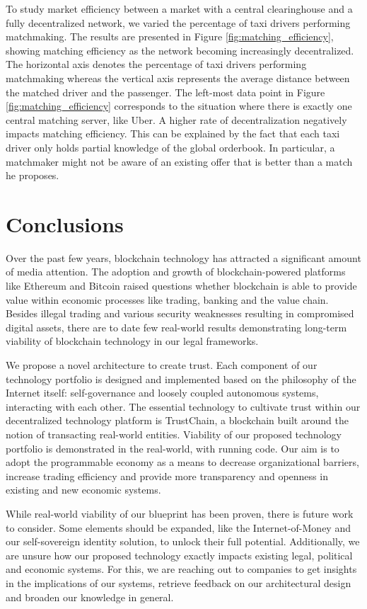 \documentclass[USenglish]{article}
\begin{document}
To study market efficiency between a market with a central clearinghouse and a fully decentralized network, we varied the percentage of taxi drivers performing matchmaking.
The results are presented in Figure \ref{fig:matching_efficiency}, showing matching efficiency as the network becoming increasingly decentralized.
The horizontal axis denotes the percentage of taxi drivers performing matchmaking whereas the vertical axis represents the average distance between the matched driver and the passenger.
The left-most data point in Figure \ref{fig:matching_efficiency} corresponds to the situation where there is exactly one central matching server, like Uber.
A higher rate of decentralization negatively impacts matching efficiency.
This can be explained by the fact that each taxi driver only holds partial knowledge of the global orderbook.
In particular, a matchmaker might not be aware of an existing offer that is better than a match he proposes.

\section{Conclusions}

Over the past few years, blockchain technology has attracted a significant amount of media attention.
The adoption and growth of blockchain-powered platforms like Ethereum and Bitcoin raised questions whether blockchain is able to provide value within economic processes like trading, banking and the value chain.
Besides illegal trading and various security weaknesses resulting in compromised digital assets, there are to date few real-world results demonstrating long-term viability of blockchain technology in our legal frameworks.

We propose a novel architecture to create trust.
Each component of our technology portfolio is designed and implemented based on the philosophy of the Internet itself: self-governance and loosely coupled autonomous systems, interacting with each other.
The essential technology to cultivate trust within our decentralized technology platform is TrustChain, a blockchain built around the notion of transacting real-world entities.
Viability of our proposed technology portfolio is demonstrated in the real-world, with running code.
Our aim is to adopt the programmable economy as a means to decrease organizational barriers, increase trading efficiency and provide more transparency and openness in existing and new economic systems.

While real-world viability of our blueprint has been proven, there is future work to consider.
Some elements should be expanded, like the Internet-of-Money and our self-sovereign identity solution, to unlock their full potential.
Additionally, we are unsure how our proposed technology exactly impacts existing legal, political and economic systems.
For this, we are reaching out to companies to get insights in the implications of our systems, retrieve feedback on our architectural design and broaden our knowledge in general.


%

\end{document}
